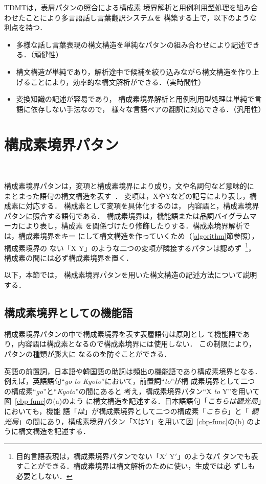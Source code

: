 TDMTは，表層パタンの照合による構成素
境界解析と用例利用型処理を組み合わせたことにより多言語話し言葉翻訳システムを
構築する上で，以下のような利点を持つ．
\vspace*{6mm}

\begin{itemize}
\item 多様な話し言葉表現の構文構造を単純なパタンの組み合わせにより記述できる．（頑健性）
\item 構文構造が単純であり，解析途中で候補を絞り込みながら構文構造を作り上げることにより，効率的な構文解析ができる．（実時間性）
\item 変換知識の記述が容易であり，
構成素境界解析と用例利用型処理は単純で言語に依存しない手法なので，
様々な言語ペアの翻訳に対応できる．（汎用性）
\end{itemize}

\section{構成素境界パタン}~\label{cb-pattern}

構成素境界パタンは，変項と構成素境界により成り，文や名詞句など意味的に
まとまった語句の構文構造を表す~\cite{Furuse2}．
変項は，XやYなどの記号により表し，構成素に対応する．
構成素として変項を具体化するのは，
内容語と，構成素境界パタンに照合する語句である．
構成素境界は，機能語または品詞バイグラムマーカにより表し，構成素
を関係づけたり修飾したりする．構成素境界解析では，構成素境界をキー
にして構文構造を作っていくため（\ref{algorithm}節参照），構成素境界の
ない「X Y」のような二つの変項が隣接するパタンは認めず~\footnote{
目的言語表現は，構成素境界パタンでない「X$'$ Y$'$」のようなパ
タンでも表すことができる．構成素境界は構文解析のために使い，生成では必
ずしも必要としない．}，
構成素の間には必ず構成素境界を置く．

以下，本節では，
構成素境界パタンを用いた構文構造の記述方法について説明する．

\subsection{構成素境界としての機能語}

構成素境界パタンの中で構成素境界を表す表層語句は原則とし
て機能語であり，内容語は構成素となるので構成素境界には使用しない．
この制限により，パタンの種類が膨大に
なるのを防ぐことができる．

英語の前置詞，日本語や韓国語の助詞は頻出の機能語であり構成素境界となる．
例えば，英語語句``{\it go to Kyoto}''において，前置詞``{\it to}''が構
成素境界として二つの構成素``{\it go}''と``{\it Kyoto}''の間にあると
考え，構成素境界パタン``X {\it to} Y''を用いて図~\ref{cbp-func}の(a)のよう
に構文構造を記述する．日本語語句「{\it こちらは観光局}」においても，機能
語「{\it は}」が構成素境界として二つの構成素「{\it こちら}」と「{\it 
観光局}」の間にあり，構成素境界パタン「XはY」を用いて図~\ref{cbp-func}の(b)
のように構文構造を記述する．

